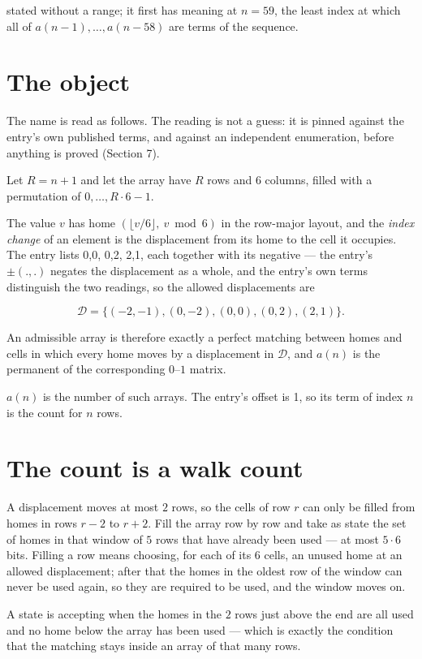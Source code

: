 \documentclass[11pt]{article}
\theoremstyle{definition}
\begin{document}
stated without a range; it first has meaning at $n = 59$, the least index at which all of $a(n-1),\dots,a(n-58)$ are terms of the sequence.

\section{The object}

The name is read as follows. The reading is not a guess: it is pinned against the entry's own published terms, and against an independent enumeration, before anything is proved (Section 7).

Let $R = n + 1$ and let the array have $R$ rows and $6$ columns, filled with a permutation of $0,\dots,R\cdot6-1$.

The value $v$ has home $(\lfloor v/6\rfloor,\ v \bmod 6)$ in the row-major layout, and the {\itshape index change} of an element is the displacement from its home to the cell it occupies. The entry lists 0,0, 0,2, 2,1, each together with its negative --- the entry's $\pm(.,.)$ negates the displacement as a whole, and the entry's own terms distinguish the two readings, so the allowed displacements are

\[\mathcal{D} = \{(-2,-1), (0,-2), (0,0), (0,2), (2,1)\}.\]

An admissible array is therefore exactly a perfect matching between homes and cells in which every home moves by a displacement in $\mathcal{D}$, and $a(n)$ is the permanent of the corresponding $0$--$1$ matrix.

$a(n)$ is the number of such arrays. The entry's offset is 1, so its term of index $n$ is the count for $n$ rows.

\section{The count is a walk count}

A displacement moves at most $2$ rows, so the cells of row $r$ can only be filled from homes in rows $r-2$ to $r+2$. Fill the array row by row and take as state the set of homes in that window of $5$ rows that have already been used --- at most $5\cdot6$ bits. Filling a row means choosing, for each of its $6$ cells, an unused home at an allowed displacement; after that the homes in the oldest row of the window can never be used again, so they are required to be used, and the window moves on.

A state is accepting when the homes in the $2$ rows just above the end are all used and no home below the array has been used --- which is exactly the condition that the matching stays inside an array of that many rows.
\end{document}
